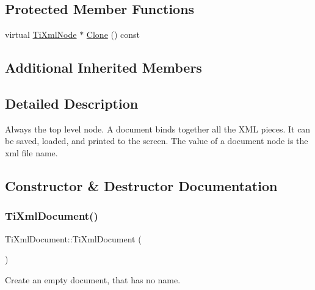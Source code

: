 \subsection*{Protected Member Functions}
\begin{DoxyCompactItemize}
\item 
virtual \hyperlink{class_ti_xml_node}{Ti\+Xml\+Node} $\ast$ \hyperlink{class_ti_xml_document_a46a4dda6c56eb106d46d4046ae1e5353}{Clone} () const
\end{DoxyCompactItemize}
\subsection*{Additional Inherited Members}


\subsection{Detailed Description}
Always the top level node. A document binds together all the X\+ML pieces. It can be saved, loaded, and printed to the screen. The \textquotesingle{}value\textquotesingle{} of a document node is the xml file name. 

\subsection{Constructor \& Destructor Documentation}
\mbox{\label{class_ti_xml_document_a9f5e84335708fde98400230f9f12659c}} 
\subsubsection{\texorpdfstring{Ti\+Xml\+Document()}{TiXmlDocument()}\hspace{0.1cm}{\footnotesize\ttfamily [1/3]}}
{\footnotesize\ttfamily Ti\+Xml\+Document\+::\+Ti\+Xml\+Document (\begin{DoxyParamCaption}{ }\end{DoxyParamCaption})}



Create an empty document, that has no name. 

